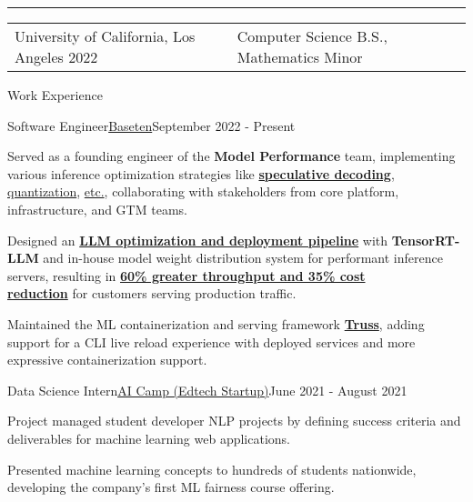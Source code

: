 \documentclass{resume}
\begin{document}
\hrule
\begin{tabularx}{\textwidth}{YY}
    \raggedright University of California, Los Angeles 2022 & \raggedleft Computer Science B.S., Mathematics Minor
\end{tabularx}

\begin{rSection}{Work Experience}
    \begin{rSubsection}{Software Engineer}{\href{https://www.baseten.co/}{Baseten}}{September 2022 - Present}
        \item Served as a founding engineer of the \textbf{Model Performance} team, implementing various inference optimization strategies like {\href{https://www.baseten.co/blog/how-we-built-production-ready-speculative-decoding-with-tensorrt-llm/}{\textbf{speculative decoding}}}, {\href{https://www.baseten.co/blog/33-faster-llm-inference-with-fp8-quantization/}{quantization}}, {\href{https://www.baseten.co/blog/driving-model-performance-optimization-2024-highlights/}{etc.}}, collaborating with stakeholders from core platform, infrastructure, and GTM teams. 
        \item Designed an {\href{https://www.baseten.co/blog/automatic-llm-optimization-with-tensorrt-llm-engine-builder/}{\textbf{LLM optimization and deployment pipeline}}} with \textbf{TensorRT-LLM} and in-house model weight distribution system for performant inference servers, resulting in {\href{https://www.baseten.co/customers/writer/}{\textbf{60\% greater throughput and 35\% cost \\ reduction}}} for customers serving production traffic.
        \item Maintained the ML containerization and serving framework {\href{https://github.com/basetenlabs/truss}{\textbf{Truss}}}, adding support for a CLI live reload experience with deployed services and more expressive containerization support.
    \end{rSubsection}
    \begin{rSubsection}{Data Science Intern}{\href{https://www.ai-camp.org/}{AI Camp (Edtech Startup)}}{June 2021 - August 2021}
        \item Project managed student developer NLP projects by defining success criteria and deliverables for machine learning web applications.
        \item Presented machine learning concepts to hundreds of students nationwide, developing the company's first ML fairness course offering.
    \end{rSubsection}

\end{rSection}
\end{document}
